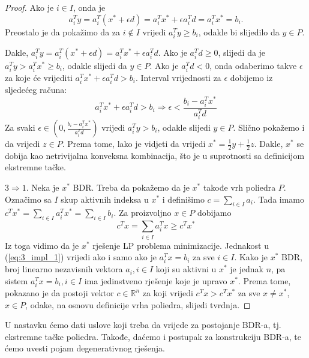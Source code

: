\documentclass[a4paper, utf8, 11pt, colorlinks]{book}
\theoremstyle{definition}
\begin{document}
\begin{proof}
       Ako je $i \in I$, onda je $$a_i^T y = a_i^T (x^* + \epsilon d) = a_i^T x^* + \epsilon a_i^T d = a_i^T x^* = b_i. $$ Preostalo je da pokažimo da za $i \not \in I$ vrijedi $a_i^T y \geq b_i$, odakle bi slijedilo da $y \in P$. 
       
       Dakle, $a_i^T y = a_i^T (x^* + \epsilon d) = a_i^T x^* + \epsilon a_i^T d $. Ako je $a_i^T d \geq 0$, slijedi da je 
       $a_i^T y > a_i^Tx^* \geq b_i$, odakle slijedi da   $y \in  P$. Ako je $a_i^T d < 0$, onda odaberimo takve $\epsilon$ za koje će vrijediti $a_i^T x^* + \epsilon a_i^T d > b_i$. Interval   vrijednosti za $\epsilon$ dobijemo iz sljedećeg računa:
       $$ a_i^T x^* + \epsilon a_i^T d > b_i \Rightarrow \epsilon < \frac{b_i - a_i^T x^*}{a_i^T d}  $$
       Za svaki $\epsilon \in \left(0,  \frac{b_i - a_i^T x^*}{a_i^T d} \right)$ vrijedi $a_i^T y > b_i$, odakle slijedi $y \in P$. Slično pokažemo i da vrijedi $z \in P$. 
       Prema tome, lako je vidjeti da vrijedi $x^* = \frac{1}{2}y +\frac{1}{2} z$. Dakle, $x^*$ se dobija kao netrivijalna konveksna kombinacija, što je u suprotnosti sa definicijom ekstremne tačke. 
       
       $3 \Rightarrow 1$. Neka je $x^*$ BDR. Treba da pokažemo da je  $x^*$  takođe vrh poliedra $P$. Označimo sa $I$ skup aktivnih indeksa u $x^*$ i definišimo $c = \sum_{i \in I} a_i$.  Tada imamo 
       $ c^T x^* = \sum_{i \in I } a_i^T x^* = \sum_{i \in I} b_i$. Za proizvoljno $x \in P$ dobijamo
       \begin{equation}\label{eq:3_impl_1}
          c^T x = \sum_{i \in I} a_i^T x \geq c^T x^*  
       \end{equation}
     Iz toga vidimo da je $x^*$ rješenje LP problema minimizacije. Jednakost u (\ref{eq:3_impl_1}) vrijedi ako i samo ako je $a_i^T x = b_i$ za sve $i \in I$. Kako je $x^*$ BDR, broj linearno nezavisnih vektora $a_i, i \in I$ koji su  aktivni u $x^*$ je jednak $n$, pa sistem $a_i^T x = b_i, i \in I$ ima jedinstveno rješenje koje je upravo $x^*$. Prema tome, pokazano je da postoji vektor $c \in \mathbb{R}^n$ za koji vrijedi $c^T x > c^T x^*$ za sve $x \neq x^*$, $x \in P$, odake, na osnovu definicije vrha poliedra, slijedi tvrdnja. 
\end{proof}
U nastavku ćemo dati uslove koji treba da vrijede za postojanje BDR-a, tj. 
 ekstremne tačke poliedra. Takođe, daćemo i postupak za konstrukciju BDR-a, te ćemo uvesti pojam degenerativnog rješenja.
\end{document}
